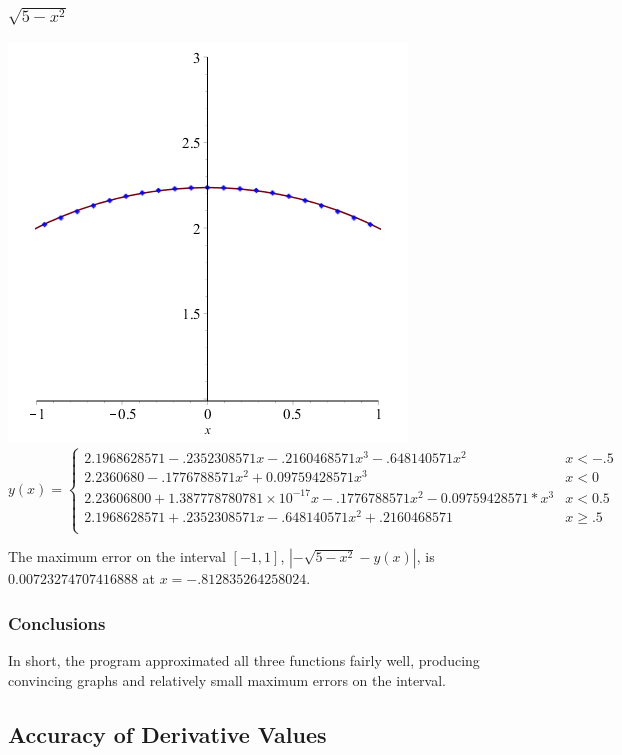 \documentclass[11pt]{article} %
\begin{document}
\subsubsection*{$\sqrt{5-x^2}$}
\includegraphics[scale=.3]{plots/dataset4approx.png}
$$
y(x) = \left\{
        \begin{array}{ll}
            2.1968628571-.2352308571x-.2160468571x^3-.648140571x^2 &  x < -.5 \\
           2.2360680-.1776788571x^2+0.09759428571x^3 & x < 0 \\
 	2.23606800+1.387778780781\times10^{-17}x-.1776788571x^2-0.09759428571*x^3 &  x < 0.5 \\
 	2.1968628571+.2352308571x-.648140571x^2+.2160468571 &  x \geq .5 \\
        \end{array}
    \right.
$$

The maximum error on the interval $[-1,1]$, $|-\sqrt{5-x^2} - y(x)|$, is $0.00723274707416888$ at $x = -.812835264258024$.

\subsubsection*{Conclusions}
\par In short, the program approximated all three functions fairly well, producing convincing graphs and relatively small maximum errors on the interval.

\newpage
\subsection*{Accuracy of Derivative Values}
\end{document}
